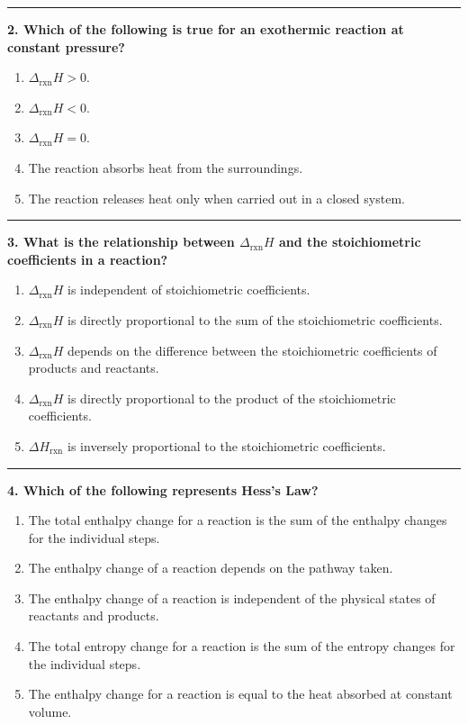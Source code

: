\documentclass[
  9pt,
]{extbook}
\providecommand{\tightlist}{%
  \setlength{\itemsep}{0pt}\setlength{\parskip}{0pt}}
\theoremstyle{definition}
\theoremstyle{definition}
\theoremstyle{definition}
\theoremstyle{definition}
\theoremstyle{remark}
\begin{document}
\begin{center}\rule{0.5\linewidth}{0.5pt}\end{center}

\textbf{2. Which of the following is true for an exothermic reaction at constant pressure?}

\begin{enumerate}
\def\labelenumi{\alph{enumi}.}
\tightlist
\item
  \(\Delta_{\text{rxn}} H > 0\).
\item
  \(\Delta_{\text{rxn}} H < 0\).
\item
  \(\Delta_{\text{rxn}} H = 0\).
\item
  The reaction absorbs heat from the surroundings.
\item
  The reaction releases heat only when carried out in a closed system.
\end{enumerate}

\begin{center}\rule{0.5\linewidth}{0.5pt}\end{center}

\textbf{3. What is the relationship between \(\Delta_{\text{rxn}} H\) and the stoichiometric coefficients in a reaction?}

\begin{enumerate}
\def\labelenumi{\alph{enumi}.}
\tightlist
\item
  \(\Delta_{\text{rxn}} H\) is independent of stoichiometric coefficients.
\item
  \(\Delta_{\text{rxn}} H\) is directly proportional to the sum of the stoichiometric coefficients.
\item
  \(\Delta_{\text{rxn}} H\) depends on the difference between the stoichiometric coefficients of products and reactants.
\item
  \(\Delta_{\text{rxn}} H\) is directly proportional to the product of the stoichiometric coefficients.
\item
  \(\Delta H_{\text{rxn}}\) is inversely proportional to the stoichiometric coefficients.
\end{enumerate}

\begin{center}\rule{0.5\linewidth}{0.5pt}\end{center}

\textbf{4. Which of the following represents Hess's Law?}

\begin{enumerate}
\def\labelenumi{\alph{enumi}.}
\tightlist
\item
  The total enthalpy change for a reaction is the sum of the enthalpy changes for the individual steps.
\item
  The enthalpy change of a reaction depends on the pathway taken.
\item
  The enthalpy change of a reaction is independent of the physical states of reactants and products.
\item
  The total entropy change for a reaction is the sum of the entropy changes for the individual steps.
\item
  The enthalpy change for a reaction is equal to the heat absorbed at constant volume.
\end{enumerate}
\end{document}
